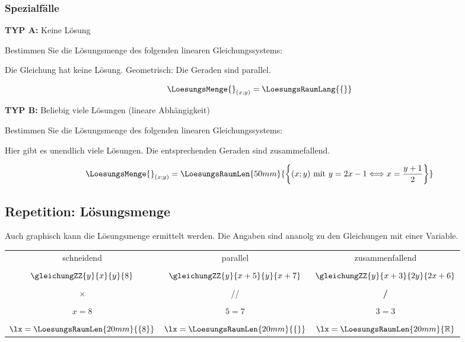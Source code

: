 %
%
\subsubsection{Spezialfälle}
\textbf{TYP A:} Keine Lösung

Bestimmen Sie die Lösungsmenge des folgenden linearen Gleichungssystems:



Die Gleichung hat keine Lösung. Geometrisch: Die Geraden sind parallel.

$$\LoesungsMenge{}_{(x;y)} = \LoesungsRaumLang{\{\}}$$

\textbf{TYP B:} Beliebig viele Lösungen (lineare Abhängigkeit)

Bestimmen Sie die Lösungsmenge des folgenden linearen Gleichungssystems:



Hier gibt es unendlich viele Lösungen. Die entsprechenden Geraden sind zusammefallend.

$$\LoesungsMenge{}_{(x;y)} = \LoesungsRaumLen{50mm}{ \left\{(x;y) \text{ mit } y = 2x-1 \Longleftrightarrow x = \frac{y+1}2 \right\} }$$

\newpage

\subsection*{Repetition: Lösungsmenge}
Auch graphisch kann die Lösungsmenge ermittelt werden. Die Angaben
sind ananolg zu den Gleichungen mit einer Variable.
\begin{center}
\begin{tabular}{c|c|c}
schneidend                 & parallel      &
zusammenfallend\\
 & & \\
\vspace{0.5mm}
$\gleichungZZ{y}{x}{y}{8}$ & $\gleichungZZ{y}{x+5}{y}{x+7}$ & $\gleichungZZ{y}{x+3}{2y}{2x+6}$   \\
 & & \\
$\times$                   & //            &   \textbf{/}      \\
 & & \\
$x=8$                      & $5=7$         &  $3=3$            \\
 & & \\
$\lx=\LoesungsRaumLen{20mm}{\{8\}}$                & $\lx=\LoesungsRaumLen{20mm}{\{\}}$    &  $\lx=\LoesungsRaumLen{20mm}{\mathbb{R}}$ \\
\end{tabular} 
\end{center}

